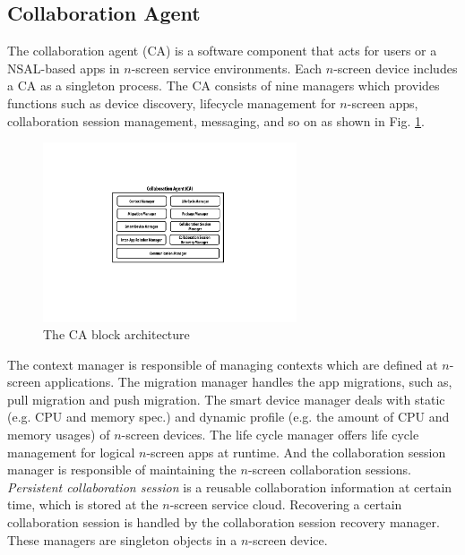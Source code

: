 \documentclass[conference]{IEEEtran}
\begin{document}
\subsection{Collaboration Agent}
The collaboration agent (CA) is a software component that acts for users or a NSAL-based apps in $n$-screen service environments.  
Each $n$-screen device includes a CA as a singleton process.
The CA consists of nine managers which provides functions such as device discovery, lifecycle management for $n$-screen apps, collaboration session management, messaging, and so on as shown in Fig. \ref{fig:collaborationagent}. 
    \begin{figure}[htb] %
    \centering
    \includegraphics[width=7.5cm,keepaspectratio]{collaborationagent}
    \caption{The CA block architecture}
    \label{fig:collaborationagent}
    \end{figure}

The context manager is responsible of managing contexts which are defined at $n$-screen applications. The migration manager handles the app migrations, such as, pull migration and push migration. 
The smart device manager deals with static (e.g. CPU and memory spec.) and dynamic profile (e.g. the amount of CPU and memory usages) of $n$-screen devices.
The life cycle manager offers life cycle management for logical $n$-screen apps at runtime.
And the collaboration session manager is responsible of maintaining the $n$-screen collaboration sessions.
\textit{Persistent collaboration session} is a reusable collaboration information at certain time, which is stored at the $n$-screen service cloud.
Recovering a certain collaboration session is handled by the collaboration session recovery manager.
These managers are singleton objects in a $n$-screen device.
\end{document}
